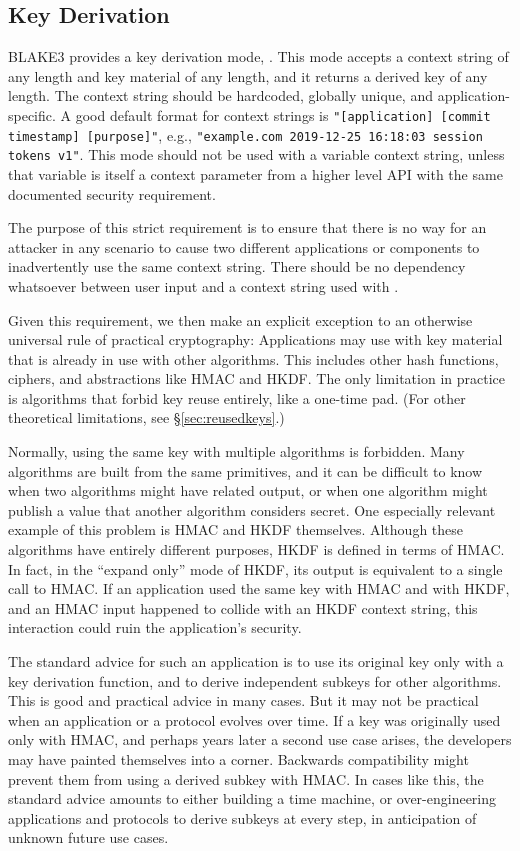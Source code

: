 \documentclass[11pt,notitlepage,a4paper]{article}
\newcommand{\flag}[1]{\texttt{\detokenize{#1}}\xspace}
\begin{document}
\subsection{Key Derivation}\label{sec:kdf}

BLAKE3 provides a key derivation mode, \flag{derive_key}. This mode accepts a
context string of any length and key material of any length, and it returns a
derived key of any length. The context string should be hardcoded, globally
unique, and application-specific. A good default format for context strings is
\texttt{"[application] [commit timestamp] [purpose]"}, e.g.,
\texttt{"example.com 2019-12-25 16:18:03 session tokens v1"}. This mode should
not be used with a variable context string, unless that variable is itself a
context parameter from a higher level API with the same documented security
requirement.

The purpose of this strict requirement is to ensure that there is no way for an
attacker in any scenario to cause two different applications or components to
inadvertently use the same context string. There should be no dependency
whatsoever between user input and a context string used with \flag{derive_key}.

Given this requirement, we then make an explicit exception to an otherwise
universal rule of practical cryptography: Applications may use
\flag{derive_key} with key material that is already in use with other
algorithms. This includes other hash functions, ciphers, and abstractions like
HMAC and HKDF. The only limitation in practice is algorithms that forbid key
reuse entirely, like a one-time pad. (For other theoretical limitations, see
\S\ref{sec:reusedkeys}.)

Normally, using the same key with multiple algorithms is forbidden. Many
algorithms are built from the same primitives, and it can be difficult to know
when two algorithms might have related output, or when one algorithm might
publish a value that another algorithm considers secret. One especially
relevant example of this problem is HMAC and HKDF themselves. Although these
algorithms have entirely different purposes, HKDF is defined in terms of HMAC.
In fact, in the ``expand only'' mode of HKDF, its output is equivalent to a
single call to HMAC. If an application used the same key with HMAC and with
HKDF, and an HMAC input happened to collide with an HKDF context string, this
interaction could ruin the application's security.

The standard advice for such an application is to use its original key only
with a key derivation function, and to derive independent subkeys for other
algorithms. This is good and practical advice in many cases. But it may not be
practical when an application or a protocol evolves over time. If a key was
originally used only with HMAC, and perhaps years later a second use case
arises, the developers may have painted themselves into a corner. Backwards
compatibility might prevent them from using a derived subkey with HMAC. In
cases like this, the standard advice amounts to either building a time machine,
or over-engineering applications and protocols to derive subkeys at every step,
in anticipation of unknown future use cases.
\end{document}
